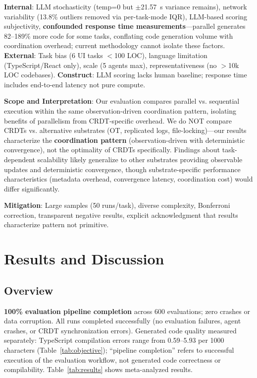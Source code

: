 \documentclass{article}
\begin{document}
\textbf{Internal}: LLM stochasticity (temp=0 but $\pm$21.57~s variance remains), network variability (13.8\% outliers removed via per-task-mode IQR), LLM-based scoring subjectivity, \textbf{confounded response time measurements}---parallel generates 82--189\% more code for some tasks, conflating code generation volume with coordination overhead; current methodology cannot isolate these factors. \textbf{External}: Task bias (6 UI tasks $<$100 LOC), language limitation (TypeScript/React only), scale (5 agents max), representativeness (no $>$10k LOC codebases). \textbf{Construct}: LLM scoring lacks human baseline; response time includes end-to-end latency not pure compute.

\textbf{Scope and Interpretation}: Our evaluation compares parallel vs. sequential execution within the same observation-driven coordination pattern, isolating benefits of parallelism from CRDT-specific overhead. We do NOT compare CRDTs vs. alternative substrates (OT, replicated logs, file-locking)---our results characterize the \textbf{coordination pattern} (observation-driven with deterministic convergence), not the optimality of CRDTs specifically. Findings about task-dependent scalability likely generalize to other substrates providing observable updates and deterministic convergence, though substrate-specific performance characteristics (metadata overhead, convergence latency, coordination cost) would differ significantly.

\textbf{Mitigation}: Large samples (50 runs/task), diverse complexity, Bonferroni correction, transparent negative results, explicit acknowledgment that results characterize pattern not primitive.

\section{Results and Discussion}
\label{sec:results}

\subsection{Overview}

\textbf{100\% evaluation pipeline completion} across 600 evaluations; zero crashes or data corruption. All runs completed successfully (no evaluation failures, agent crashes, or CRDT synchronization errors). Generated code quality measured separately: TypeScript compilation errors range from 0.59--5.93 per 1000 characters (Table~\ref{tab:objective}); ``pipeline completion'' refers to successful execution of the evaluation workflow, not generated code correctness or compilability. Table~\ref{tab:results} shows meta-analyzed results.
\end{document}
